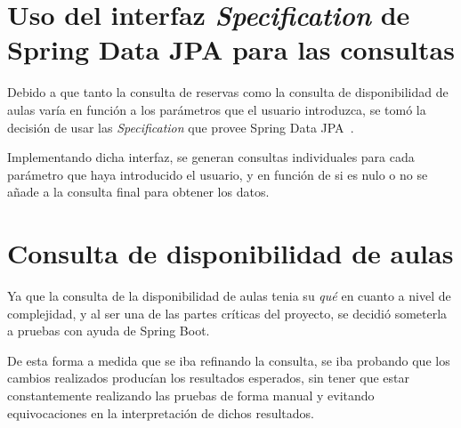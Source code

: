 \section{Uso del interfaz \textit{Specification} de Spring Data JPA para las consultas}
Debido a que tanto la consulta de reservas como la consulta de disponibilidad de aulas varía en función a los parámetros que el usuario introduzca, se tomó la decisión de usar las \textit{Specification} que provee Spring Data JPA~\cite{specification_spring_data}.

Implementando dicha interfaz, se generan consultas individuales para cada parámetro que haya introducido el usuario, y en función de si es nulo o no se añade a la consulta final para obtener los datos.

\section{Consulta de disponibilidad de aulas}
Ya que la consulta de la disponibilidad de aulas tenia su \textit{qué} en cuanto a nivel de complejidad, y al ser una de las partes críticas del proyecto, se decidió someterla a pruebas con ayuda de Spring Boot.

De esta forma a medida que se iba refinando la consulta, se iba probando que los cambios realizados producían los resultados esperados, sin tener que estar constantemente realizando las pruebas de forma manual y evitando equivocaciones en la interpretación de dichos resultados.